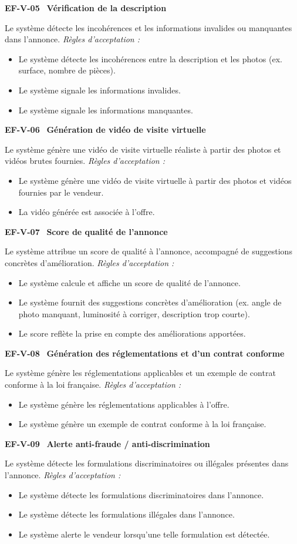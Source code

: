 \documentclass[11pt,a4paper]{article}
\newcommand{\exigence}[2]{%
  \par\vspace{6pt}%
  \noindent\colorbox{light}{%
    \parbox{\dimexpr\textwidth-2\fboxsep}{%
      \textbf{\color{primary}#1} \textemdash\ \textbf{#2}%
    }%
  }\par\vspace{2pt}%
}
\newenvironment{acceptation}
  {\vspace{2pt}\noindent\textit{Règles d'acceptation :}
   \begin{itemize}[leftmargin=1.4em,itemsep=1pt,topsep=2pt]}
  {\end{itemize}\vspace{4pt}}
\begin{document}
\exigence{EF-V-05}{Vérification de la description}
Le système détecte les incohérences et les informations invalides ou
manquantes dans l'annonce.
\begin{acceptation}
  \item Le système détecte les incohérences entre la description et les photos (ex. surface, nombre de pièces).
  \item Le système signale les informations invalides.
  \item Le système signale les informations manquantes.
\end{acceptation}

\exigence{EF-V-06}{Génération de vidéo de visite virtuelle}
Le système génère une vidéo de visite virtuelle réaliste à partir des photos
et vidéos brutes fournies.
\begin{acceptation}
  \item Le système génère une vidéo de visite virtuelle à partir des photos et vidéos fournies par le vendeur.
  \item La vidéo générée est associée à l'offre.
\end{acceptation}

\exigence{EF-V-07}{Score de qualité de l'annonce}
Le système attribue un score de qualité à l'annonce, accompagné de
suggestions concrètes d'amélioration.
\begin{acceptation}
  \item Le système calcule et affiche un score de qualité de l'annonce.
  \item Le système fournit des suggestions concrètes d'amélioration (ex. angle de photo manquant, luminosité à corriger, description trop courte).
  \item Le score reflète la prise en compte des améliorations apportées.
\end{acceptation}

\exigence{EF-V-08}{Génération des réglementations et d'un contrat conforme}
Le système génère les réglementations applicables et un exemple de contrat
conforme à la loi française.
\begin{acceptation}
  \item Le système génère les réglementations applicables à l'offre.
  \item Le système génère un exemple de contrat conforme à la loi française.
\end{acceptation}

\exigence{EF-V-09}{Alerte anti-fraude / anti-discrimination}
Le système détecte les formulations discriminatoires ou illégales présentes
dans l'annonce.
\begin{acceptation}
  \item Le système détecte les formulations discriminatoires dans l'annonce.
  \item Le système détecte les formulations illégales dans l'annonce.
  \item Le système alerte le vendeur lorsqu'une telle formulation est détectée.
\end{acceptation}
\end{document}
